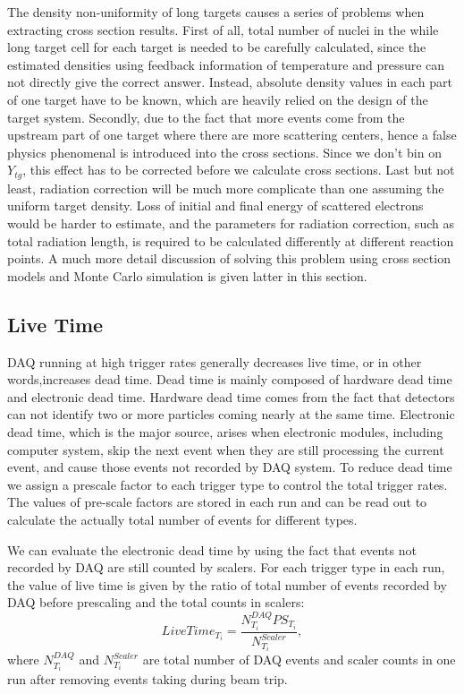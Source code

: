 \documentclass[a4paper,18.pt]{article}
\begin{document}
The density non-uniformity of long targets causes a series of problems when extracting cross section results. First of all, total number of nuclei in the while long target cell for each target is needed to be carefully calculated, since the estimated densities using feedback information of temperature and pressure can not directly give the correct answer. Instead, absolute density values in each part of one target have to be known, which are heavily relied on the design of the target system. Secondly, due to the fact that more events come from the upstream part of one target where there are more scattering centers, hence a false physics phenomenal is introduced into the cross sections. Since we don't bin on $Y_{tg}$, this effect has to be corrected before we calculate cross sections. Last but not least, radiation correction will be much more complicate than one assuming the uniform target density. Loss of initial and final energy of scattered electrons would be harder to estimate, and the parameters for radiation correction, such as total radiation length, is required to be calculated differently at different reaction points. A much more detail discussion of solving this problem using cross section models and Monte Carlo simulation is given latter in this section.

\subsection{Live Time}

DAQ running at high trigger rates generally decreases live time, or in other words,increases dead time. Dead time is mainly composed of hardware dead time and electronic dead time. Hardware dead time comes from the fact that detectors can not identify two or more particles coming nearly at the same time. Electronic dead time, which is the major source, arises when electronic modules, including computer system, skip the next event when they are still processing the current event, and cause those events not recorded by DAQ system. To reduce dead time we assign a prescale factor to each trigger type to control the total trigger rates. The values of pre-scale factors are stored in each run and can be read out to calculate the actually total number of events for different types. 

We can evaluate the electronic dead time by using the fact that events not recorded by DAQ are still counted by scalers. For each trigger type in each run, the value of live time is given by the ratio of total number of events recorded by DAQ before prescaling and the total counts in scalers:
\begin{equation}
  LiveTime_{T_{i}} = \frac{N_{T_{i}}^{DAQ} PS_{T_{i}}}{N_{T_{i}}^{Scaler}},
\end{equation}
where $N_{T_{i}}^{DAQ}$ and $N_{T_{i}}^{Scaler}$ are total number of DAQ events and scaler counts in one run after removing events taking during beam trip.
\end{document}
